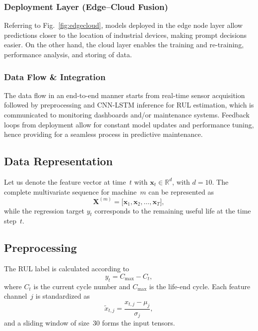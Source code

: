 \documentclass[conference]{IEEEtran}
\begin{document}
\subsubsection{Deployment Layer (Edge--Cloud Fusion)}
Referring to Fig.~\ref{fig:edgecloud}, models deployed in the edge node layer allow predictions closer to the location of industrial devices, making prompt decisions easier. On the other hand, the cloud layer enables the training and re-training, performance analysis, and storing of data.

\subsubsection{Data Flow \& Integration}
The data flow in an end-to-end manner starts from real-time sensor acquisition followed by preprocessing and CNN-LSTM inference for RUL estimation, which is communicated to monitoring dashboards and/or maintenance systems. Feedback loops from deployment allow for constant model updates and performance tuning, hence providing for a seamless process in predictive maintenance.

\subsection{Data Representation}
Let us denote the feature vector at time~$t$ with $\mathbf{x}_{t} \in \mathbb{R}^{d}$, with $d=10$. The complete multivariate sequence for machine~$m$ can be represented as
\begin{equation}
  \mathbf{X}^{(m)} = \bigl[\mathbf{x}_{1}, \mathbf{x}_{2}, \ldots, \mathbf{x}_{T}\bigr],
  \label{eq:sequence}
\end{equation}
while the regression target $y_{t}$ corresponds to the remaining useful life at the time step~$t$.

\subsection{Preprocessing}
The RUL label is calculated according to
\begin{equation}
  y_{t} = C_{\max} - C_{t},
  \label{eq:rul}
\end{equation}
where $C_{t}$ is the current cycle number and $C_{\max}$ is the life-end cycle. Each feature channel~$j$ is standardized as
\begin{equation}
  \tilde{x}_{t,j} = \frac{x_{t,j} - \mu_{j}}{\sigma_{j}},
  \label{eq:norm}
\end{equation}
and a sliding window of size~30 forms the input tensors.
\end{document}

